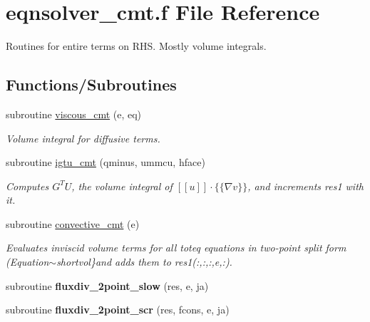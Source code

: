 \hypertarget{eqnsolver__cmt_8f}{\section{eqnsolver\-\_\-cmt.\-f File Reference}
\label{eqnsolver__cmt_8f}
}


Routines for entire terms on R\-H\-S. Mostly volume integrals.  


\subsection*{Functions/\-Subroutines}
\begin{DoxyCompactItemize}
\item 
subroutine \hyperlink{group__diffhvol_ga6d611a250fb98acf77e8a3880c0e608d}{viscous\-\_\-cmt} (e, eq)
\begin{DoxyCompactList}\small\item\em Volume integral for diffusive terms. \end{DoxyCompactList}\item 
subroutine \hyperlink{group__vsurf_ga98d826061a0ffb225d37cb73b86a9475}{igtu\-\_\-cmt} (qminus, ummcu, hface)
\begin{DoxyCompactList}\small\item\em Computes $G^T U$, the volume integral of $[[u]]\cdot\{\{\nabla v\}\}$, and increments res1 with it. \end{DoxyCompactList}\item 
subroutine \hyperlink{group__convhvol_ga77e7d7a46950fcbbf072e8e900cee272}{convective\-\_\-cmt} (e)
\begin{DoxyCompactList}\small\item\em Evaluates inviscid volume terms for all toteq equations in two-\/point split form (Equation$\sim$shortvol\}and adds them to res1(\-:,\-:,\-:,e,\-:). \end{DoxyCompactList}\item 
\hypertarget{eqnsolver__cmt_8f_a2135bd9a2e75728f817f2b8af7124073}{subroutine {\bfseries fluxdiv\-\_\-2point\-\_\-slow} (res, e, ja)}\label{eqnsolver__cmt_8f_a2135bd9a2e75728f817f2b8af7124073}

\item 
\hypertarget{eqnsolver__cmt_8f_aff3fe4ef3d2532483001e44143232058}{subroutine {\bfseries fluxdiv\-\_\-2point\-\_\-scr} (res, fcons, e, ja)}\label{eqnsolver__cmt_8f_aff3fe4ef3d2532483001e44143232058}


\end{DoxyCompactItemize}
